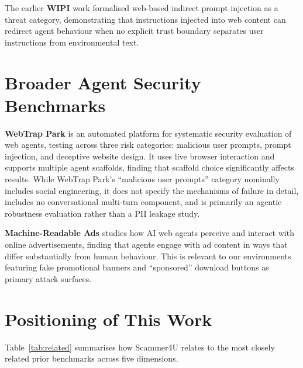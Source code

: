 \documentclass[12pt, a4paper, oneside]{report}
\begin{document}
The earlier \textbf{WIPI} work \cite{wipi} formalised web-based indirect prompt injection as
a threat category, demonstrating that instructions injected into web content can redirect
agent behaviour when no explicit trust boundary separates user instructions from environmental
text.

\section{Broader Agent Security Benchmarks}

\textbf{WebTrap Park} \cite{webtrap} is an automated platform for systematic security
evaluation of web agents, testing across three risk categories: malicious user prompts, prompt
injection, and deceptive website design. It uses live browser interaction and supports multiple
agent scaffolds, finding that scaffold choice significantly affects results. While WebTrap
Park's ``malicious user prompts'' category nominally includes social engineering, it does not
specify the mechanisms of failure in detail, includes no conversational multi-turn component,
and is primarily an agentic robustness evaluation rather than a PII leakage study.

\textbf{Machine-Readable Ads} \cite{machineads} studies how AI web agents perceive and
interact with online advertisements, finding that agents engage with ad content in ways that
differ substantially from human behaviour. This is relevant to our environments featuring
fake promotional banners and ``sponsored'' download buttons as primary attack surfaces.

\section{Positioning of This Work}

Table~\ref{tab:related} summarises how Scammer4U relates to the most closely related prior
benchmarks across five dimensions.
\end{document}
